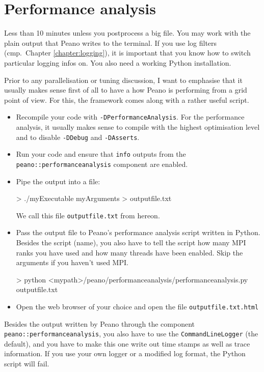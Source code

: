 \section{Performance analysis}


\chapterDescription
  {
    Less than 10 minutes unless you postprocess a big file.
  }
  {
    You may work with the plain output that Peano writes to the terminal. If you
    use log filters (cmp.~Chapter \ref{chapter:logging}), it is important that
    you know how to switch particular logging infos on. You also need a working
    Python installation.
  }

\noindent
Prior to any parallelisation or tuning discussion, I want to emphasise that it
usually makes sense first of all to have a how Peano is performing from a grid
point of view. For this, the framework comes along with a rather useful script.

\begin{itemize}
  \item Recompile your code with \texttt{-DPerformanceAnalysis}. For the
    performance analysis, it usually makes sense to compile with the highest
    optimisation level and to disable \texttt{-DDebug} and \texttt{-DAsserts}.
  \item Run your code and ensure that \texttt{info} outputs from the
    \texttt{peano::performanceanalysis} component are enabled.
  \item Pipe the output into a file:
    \begin{code}
> ./myExecutable myArguments > outputfile.txt
    \end{code} 
    We call this file \texttt{outputfile.txt} from hereon.
  \item Pass the output file to Peano's performance analysis script written in
  Python. Besides the script (name), you also have to tell the script how many 
    MPI ranks you have used and how many threads have been enabled. Skip
    the arguments if you haven't used MPI.
    \begin{code}
> python <mypath>/peano/performanceanalysis/performanceanalysis.py outputfile.txt
    \end{code} 
  \item Open the web browser of your choice and open the file
  \texttt{outputfile.txt.html}
\end{itemize}

\begin{remark}
Besides the output written by Peano through the component
\texttt{peano::performanceanalysis}, you also have to use the
\texttt{CommandLineLogger} (the default), and you have to make this one write
out time stamps as well as trace information. If you use your own logger or a
modified log format, the Python script will fail.
\end{remark}

